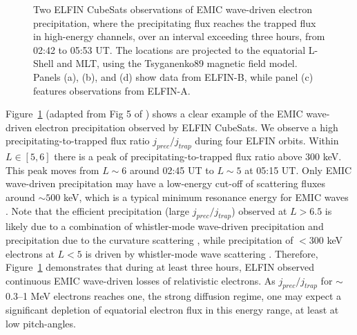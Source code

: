 \documentclass[
  letterpaper,
  DIV=11,
  numbers=noendperiod]{scrartcl}
\begin{document}
\begin{figure}


\caption{\label{fig-elfin}Two ELFIN CubeSats observations of EMIC wave-driven electron precipitation, where the precipitating flux reaches the trapped flux in high-energy channels, over an interval exceeding three hours, from 02:42 to 05:53 UT. The locations are projected to the equatorial L-Shell and MLT, using the Tsyganenko89 magnetic field model. Panels (a), (b), and (d) show data from ELFIN-B, while panel (c) features observations from ELFIN-A.}

\end{figure}%

Figure~\ref{fig-elfin} (adapted from Fig 5 of \citet{angelopoulosEnergeticElectronPrecipitation2023}) shows a clear example of the EMIC wave-driven electron precipitation observed by ELFIN CubeSats. We observe a high precipitating-to-trapped flux ratio \(j_{prec}/j_{trap}\) during four ELFIN orbits.
Within \(L \in [5,6]\) there is a peak of precipitating-to-trapped flux ratio above \(300\) keV. This peak moves from \(L \sim 6\) around 02:45 UT to \(L \sim 5\) at 05:15 UT. Only EMIC wave-driven precipitation may have a low-energy cut-off of scattering fluxes around \(\sim 500\) keV, which is a typical minimum resonance energy for EMIC waves \citep[see the identification of other EMIC wave-driven precipitation events with similar precipitating-to-trapped ratios in][]{anNonresonantScatteringRelativistic2022, angelopoulosEnergeticElectronPrecipitation2023}. Note that the efficient precipitation (large \(j_{prec}/j_{trap}\)) observed at \(L>6.5\) is likely due to a combination of whistler-mode wave-driven precipitation \citep{shiRoleULFWaves2022} and precipitation due to the curvature scattering \citep{wilkinsStatisticalCharacteristicsElectron2023}, while precipitation of \(<300\) keV electrons at \(L<5\) is driven by whistler-mode wave scattering \citep[see similar examples of quasi-periodical precipitation on the dusk flank in][]{artemyevRoleDuctingRelativistic2021}.
Therefore, Figure~\ref{fig-elfin} demonstrates that during at least three hours, ELFIN observed continuous EMIC wave-driven losses of relativistic electrons. As \(j_{prec}/j_{trap}\) for \(\sim\) 0.3--1 MeV electrons reaches one, the strong diffusion regime, one may expect a significant depletion of equatorial electron flux in this energy range, at least at low pitch-angles.
\end{document}
